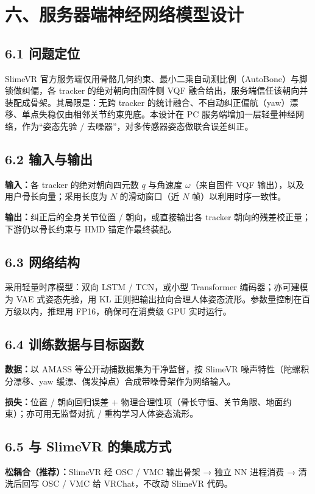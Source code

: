 \documentclass[UTF8,11pt,a4paper]{ctexart}
\begin{document}
\section{六、服务器端神经网络模型设计}

\subsection{6.1 问题定位}
SlimeVR 官方服务端仅用骨骼几何约束、最小二乘自动测比例（AutoBone）与脚锁做纠偏，各 tracker 的绝对朝向由固件侧 VQF 融合给出，服务端信任该朝向并装配成骨架。其局限是：无跨 tracker 的统计融合、不自动纠正偏航（yaw）漂移、单点失稳仅由相邻关节约束兜底。本设计在 PC 服务端增加一层轻量神经网络，作为“姿态先验 / 去噪器”，对多传感器姿态做联合误差纠正。

\subsection{6.2 输入与输出}
\textbf{输入：}各 tracker 的绝对朝向四元数 $q$ 与角速度 $\omega$（来自固件 VQF 输出），以及用户骨长向量；采用长度为 $N$ 的滑动窗口（近 $N$ 帧）以利用时序一致性。

\textbf{输出：}纠正后的全身关节位置 / 朝向，或直接输出各 tracker 朝向的残差校正量；下游仍以骨长约束与 HMD 锚定作最终装配。

\subsection{6.3 网络结构}
采用轻量时序模型：双向 LSTM / TCN，或小型 Transformer 编码器；亦可建模为 VAE 式姿态先验，用 KL 正则把输出拉向合理人体姿态流形。参数量控制在百万级以内，推理用 FP16，确保可在消费级 GPU 实时运行。

\subsection{6.4 训练数据与目标函数}
\textbf{数据：}以 AMASS 等公开动捕数据集为干净监督，按 SlimeVR 噪声特性（陀螺积分漂移、yaw 缓漂、偶发掉点）合成带噪骨架作为网络输入。

\textbf{损失：}位置 / 朝向回归误差 + 物理合理性项（骨长守恒、关节角限、地面约束）；亦可用无监督对抗 / 重构学习人体姿态流形。

\subsection{6.5 与 SlimeVR 的集成方式}
\textbf{松耦合（推荐）：}SlimeVR 经 OSC / VMC 输出骨架 → 独立 NN 进程消费 → 清洗后回写 OSC / VMC 给 VRChat，不改动 SlimeVR 代码。
\end{document}
